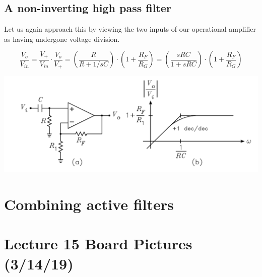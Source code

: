 \documentclass[11pt]{book}
\begin{document}
\subsection{A non-inverting high pass filter}

Let us again approach this  by viewing the two inputs of our operational amplifier as having undergone voltage division.

\begin{equation}
	\frac{V_o}{V_{in}} = \frac{V_+}{V_{in}}\cdot \frac{V_o}{V_+} = \left(\frac{R}{R+ 1/sC}\right)\cdot\left(1+ \frac{R_F}{R_G}\right) = \left(\frac{sRC}{1 + sRC}\right)\cdot\left(1+ \frac{R_F}{R_G}\right) 
\end{equation}

\begin{center}
	\includegraphics[width=\textwidth]{figures/15.05.png}
\end{center}


\section{Combining active filters}


\section{Lecture 15 Board Pictures (3/14/19)}
\end{document}
